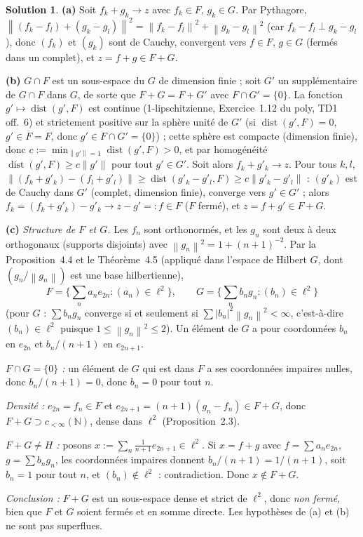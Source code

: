\documentclass[11pt,a4paper]{article}
\newcommand{\N}{\mathbb{N}}
\newcommand{\adh}[1]{\overline{#1}}
\newcommand{\dist}{\operatorname{dist}}
\newcommand{\norm}[1]{\left\|#1\right\|}
\newcommand{\ie}{c'est-à-dire}
\theoremstyle{definition}
\newtheorem*{solution}{Solution}
\begin{document}
\begin{solution}
\noindent\textbf{(a)} Soit $f_k+g_k\to z$ avec $f_k\in F$, $g_k\in G$. Par Pythagore, $\norm{(f_k-f_l)+(g_k-g_l)}^2=\norm{f_k-f_l}^2+\norm{g_k-g_l}^2$ (car $f_k-f_l\perp g_k-g_l$), donc $(f_k)$ et $(g_k)$ sont de Cauchy, convergent vers $f\in F$, $g\in G$ (fermés dans un complet), et $z=f+g\in F+G$.

\medskip
\noindent\textbf{(b)} $G\cap F$ est un sous-espace du $G$ de dimension finie ; soit $G'$ un supplémentaire de $G\cap F$ dans $G$, de sorte que $F+G=F+G'$ avec $F\cap G'=\{0\}$. La fonction $g'\mapsto\dist(g',F)$ est continue (1-lipschitzienne, Exercice~1.12 du poly, TD1 off.~6) et strictement positive sur la sphère unité de $G'$ (si $\dist(g',F)=0$, $g'\in\adh F=F$, donc $g'\in F\cap G'=\{0\}$) ; cette sphère est compacte (dimension finie), donc $c:=\min_{\norm{g'}=1}\dist(g',F)>0$, et par homogénéité $\dist(g',F)\ge c\norm{g'}$ pour tout $g'\in G'$. Soit alors $f_k+g'_k\to z$. Pour tous $k,l$, $\norm{(f_k+g'_k)-(f_l+g'_l)}\ge\dist(g'_k-g'_l,F)\ge c\norm{g'_k-g'_l}$ : $(g'_k)$ est de Cauchy dans $G'$ (complet, dimension finie), converge vers $g'\in G'$ ; alors $f_k=(f_k+g'_k)-g'_k\to z-g'=:f\in F$ ($F$ fermé), et $z=f+g'\in F+G$.

\medskip
\noindent\textbf{(c)} \emph{Structure de $F$ et $G$.} Les $f_n$ sont orthonormés, et les $g_n$ sont deux à deux orthogonaux (supports disjoints) avec $\norm{g_n}^2=1+(n+1)^{-2}$. Par la Proposition~4.4 et le Théorème~4.5 (appliqué dans l'espace de Hilbert $G$, dont $(g_n/\norm{g_n})$ est une base hilbertienne),
\[
F=\Big\{\sum_na_ne_{2n}:(a_n)\in\ell^2\Big\},\qquad G=\Big\{\sum_nb_ng_n:(b_n)\in\ell^2\Big\}
\]
(pour $G$ : $\sum b_ng_n$ converge si et seulement si $\sum|b_n|^2\norm{g_n}^2<\infty$, \ie{} $(b_n)\in\ell^2$ puisque $1\le\norm{g_n}^2\le2$). Un élément de $G$ a pour coordonnées $b_n$ en $e_{2n}$ et $b_n/(n+1)$ en $e_{2n+1}$.

\emph{$F\cap G=\{0\}$ :} un élément de $G$ qui est dans $F$ a ses coordonnées impaires nulles, donc $b_n/(n+1)=0$, donc $b_n=0$ pour tout $n$.

\emph{Densité :} $e_{2n}=f_n\in F$ et $e_{2n+1}=(n+1)(g_n-f_n)\in F+G$, donc $F+G\supset c_{<\infty}(\N)$, dense dans $\ell^2$ (Proposition~2.3).

\emph{$F+G\ne H$ :} posons $x:=\sum_n\frac1{n+1}e_{2n+1}\in\ell^2$. Si $x=f+g$ avec $f=\sum a_ne_{2n}$, $g=\sum b_ng_n$, les coordonnées impaires donnent $b_n/(n+1)=1/(n+1)$, soit $b_n=1$ pour tout $n$, et $(b_n)\notin\ell^2$ : contradiction. Donc $x\notin F+G$.

\emph{Conclusion :} $F+G$ est un sous-espace dense et strict de $\ell^2$, donc \emph{non fermé}, bien que $F$ et $G$ soient fermés et en somme directe. Les hypothèses de (a) et (b) ne sont pas superflues.
\end{solution}
\end{document}
